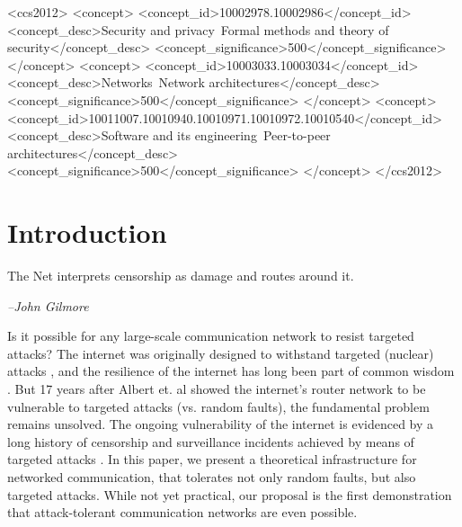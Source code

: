 \documentclass[sigconf]{acmart}
\begin{document}
%
%
\begin{CCSXML}
<ccs2012>
<concept>
<concept_id>10002978.10002986</concept_id>
<concept_desc>Security and privacy~Formal methods and theory of security</concept_desc>
<concept_significance>500</concept_significance>
</concept>
<concept>
<concept_id>10003033.10003034</concept_id>
<concept_desc>Networks~Network architectures</concept_desc>
<concept_significance>500</concept_significance>
</concept>
<concept>
<concept_id>10011007.10010940.10010971.10010972.10010540</concept_id>
<concept_desc>Software and its engineering~Peer-to-peer architectures</concept_desc>
<concept_significance>500</concept_significance>
</concept>
</ccs2012>
\end{CCSXML} 





\maketitle

\section{Introduction}

\epigraph{The Net interprets censorship as damage and routes around it.}{\textit{--John Gilmore} \cite{elmer-dewitt_first_1993}}

Is it possible for any large-scale communication network to resist targeted attacks?
The internet was originally designed to withstand targeted (nuclear) attacks \cite{baran_distributed_1964},
and the resilience of the internet has long been part of common wisdom \cite{elmer-dewitt_first_1993}.
But 17 years after Albert et. al \cite{albert_error_2000}
showed the internet's router network to be vulnerable to targeted attacks (vs. random faults),
the fundamental problem remains unsolved.
The ongoing vulnerability of the internet is evidenced by a long history of 
censorship and surveillance incidents achieved by means of targeted attacks
\cite{dainotti_analysis_2011}.
In this paper, we present a theoretical infrastructure for networked communication,
that tolerates not only random faults, but also targeted attacks.
While not yet practical, our proposal is the first demonstration that
attack-tolerant communication networks are even possible.
\end{document}
